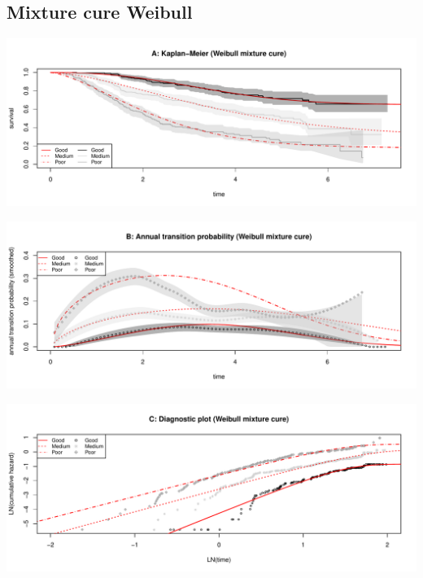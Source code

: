 \documentclass[]{article}
\begin{document}
\newpage 

\subsection{Mixture cure Weibull}\label{mixture-cure-weibull}

\begin{flushleft}\includegraphics[height=0.25\textheight]{Images/cure_weib_mix-1} \end{flushleft}

\begin{flushleft}\includegraphics[height=0.25\textheight]{Images/cure_weib_mix-2} \end{flushleft}

\begin{flushleft}\includegraphics[height=0.25\textheight]{Images/cure_weib_mix-3} \end{flushleft}
\end{document}
